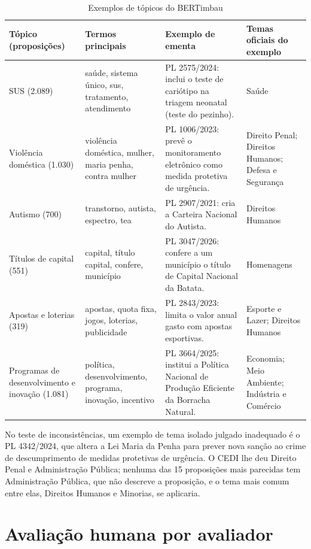 \documentclass[12pt]{article}
\newcommand{\tabfont}{\fontsize{9}{11}\selectfont\setlength{\tabcolsep}{2.5pt}}
\begin{document}
\begin{table}[H]
\centering
\caption{Exemplos de tópicos do BERTimbau}
\label{tab:exemplos-topicos}
\tabfont
\begin{tabularx}{\textwidth}{>{\raggedright\arraybackslash}p{2.6cm} >{\raggedright\arraybackslash}p{3.3cm} >{\raggedright\arraybackslash}X >{\raggedright\arraybackslash}p{2.6cm}}
\toprule
\textbf{Tópico (proposições)} & \textbf{Termos principais} & \textbf{Exemplo de ementa} & \textbf{Temas oficiais do exemplo} \\
\midrule
SUS (2.089) & saúde, sistema único, sus, tratamento, atendimento & PL 2575/2024: inclui o teste de cariótipo na triagem neonatal (teste do pezinho). & Saúde \\
\midrule
Violência doméstica (1.030) & violência doméstica, mulher, maria penha, contra mulher & PL 1006/2023: prevê o monitoramento eletrônico como medida protetiva de urgência. & Direito Penal; Direitos Humanos; Defesa e Segurança \\
\midrule
Autismo (700) & transtorno, autista, espectro, tea & PL 2907/2021: cria a Carteira Nacional do Autista. & Direitos Humanos \\
\midrule
Títulos de capital (551) & capital, título capital, confere, município & PL 3047/2026: confere a um município o título de Capital Nacional da Batata. & Homenagens \\
\midrule
Apostas e loterias (319) & apostas, quota fixa, jogos, loterias, publicidade & PL 2843/2023: limita o valor anual gasto com apostas esportivas. & Esporte e Lazer; Direitos Humanos \\
\midrule
Programas de desenvolvimento e inovação (1.081) & política, desenvolvimento, programa, inovação, incentivo & PL 3664/2025: institui a Política Nacional de Produção Eficiente da Borracha Natural. & Economia; Meio Ambiente; Indústria e Comércio \\
\bottomrule
\end{tabularx}
\end{table}

No teste de inconsistências, um exemplo de tema isolado julgado inadequado é o PL 4342/2024, que altera a Lei Maria da Penha para prever nova sanção ao crime de descumprimento de medidas protetivas de urgência. O CEDI lhe deu Direito Penal e Administração Pública; nenhuma das 15 proposições mais parecidas tem Administração Pública, que não descreve a proposição, e o tema mais comum entre elas, Direitos Humanos e Minorias, se aplicaria.

\clearpage
\section{Avaliação humana por avaliador}
\label{app:avaliacao}
\end{document}
